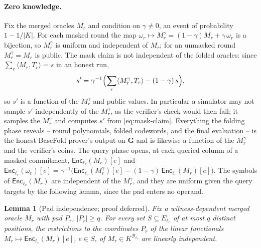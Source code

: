 \documentclass{article}
\newtheorem{lemma}[theorem]{Lemma}
\theoremstyle{definition}
\newcommand{\BB}{\mathcal{B}}
\begin{document}
\paragraph{Zero knowledge.}
Fix the merged oracles $M_r$ and condition on $\gamma \ne 0$, an event of probability $1 - 1/|K|$. For each masked round the map $\omega_r \mapsto M^\gamma_r = (1 - \gamma) M_r + \gamma\, \omega_r$ is a bijection, so $M^\gamma_r$ is uniform and independent of $M_r$; for an unmasked round $M^\gamma_r = M_r$ is public. The mask claim is not independent of the folded oracles: since $\sum_r \langle M_r, T_r \rangle = s$ in an honest run,
\begin{equation}
  s' = \gamma^{-1} \Bigl( \sum_r \langle M^\gamma_r, T_r \rangle - (1 - \gamma)\, s \Bigr),
  \label{eq:mask-claim}
\end{equation}
so $s'$ is a function of the $M^\gamma_r$ and public values. In particular a simulator may not sample $s'$ independently of the $M^\gamma_r$, as the verifier's check would then fail; it samples the $M^\gamma_r$ and computes $s'$ from \eqref{eq:mask-claim}. Everything the folding phase reveals -- round polynomials, folded codewords, and the final evaluation -- is the honest BaseFold prover's output on $\boldsymbol{G}$ and is likewise a function of the $M^\gamma_r$ and the verifier's coins. The query phase opens, at each queried column of a masked commitment, $\textsf{Enc}_{\ell_r}(M_r)[e]$ and $\textsf{Enc}_{\ell_r}(\omega_r)[e] = \gamma^{-1} \bigl( \textsf{Enc}_{\ell_r}(M^\gamma_r)[e] - (1 - \gamma)\, \textsf{Enc}_{\ell_r}(M_r)[e] \bigr)$. The symbols of $\textsf{Enc}_{\ell_r}(M_r)$ are independent of the $M^\gamma_r$, and they are uniform given the query targets by the following lemma, since the pad enters no operand.

\begin{lemma}[Pad independence; proof deferred]
\label{lem:pad-independence}
Fix a witness-dependent merged oracle $M_r$ with pad $P_r$, $|P_r| \ge q$. For every set $S \subseteq E_{\ell_r}$ of at most $q$ distinct positions, the restrictions to the coordinates $P_r$ of the linear functionals $M_r \mapsto \textsf{Enc}_{\ell_r}(M_r)[e]$, $e \in S$, of $M_r \in K^{\BB_{\ell_r}}$ are linearly independent.
\end{lemma}
\end{document}

